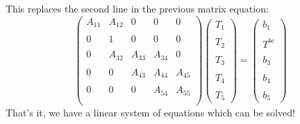 This replaces the second line in the previous matrix equation:
\[
\left(
\begin{array}{ccccc}
A_{11} & A_{12} & 0& 0& 0\\ \\
0 & 1 & 0 & 0 & 0 \\ \\
0 & A_{32} & A_{33}&  A_{34} & 0 \\\\
0&0&   A_{43} & A_{44}&  A_{45} \\\\
0&0&0   & A_{54}&  A_{55} \\\\
\end{array}
\right)
\left(
\begin{array}{c}
T_1 \\\\ T_2 \\\\ T_3 \\\\ T_4 \\\\ T_5
\end{array}
\right)
=
\left(
\begin{array}{c}
b_{1} \\ \\
T^{bc} \\ \\
b_{3}\\\\
b_{4}\\\\
b_{5}
\end{array}
\right)
\]
That's it, we have a linear system of equations which can be solved!






